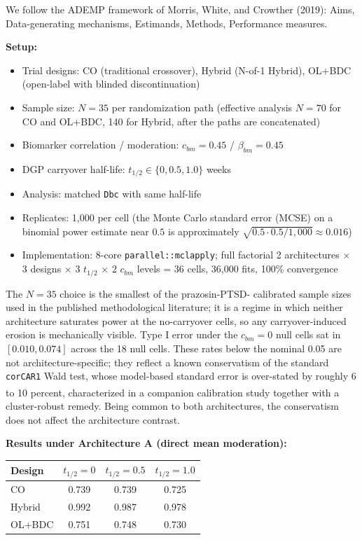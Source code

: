 \documentclass[
  11pt,
]{article}
\begin{document}
We follow the ADEMP framework of Morris, White, and Crowther (2019):
Aims, Data-generating mechanisms, Estimands, Methods, Performance
measures.

\textbf{Setup:}

\begin{itemize}
\item Trial designs: CO (traditional crossover), Hybrid (N-of-1
  Hybrid), OL+BDC (open-label with blinded discontinuation)
\item Sample size: $N = 35$ per randomization path (effective
  analysis $N = 70$ for CO and OL+BDC, 140 for Hybrid, after the
  paths are concatenated)
\item Biomarker correlation / moderation: $c_{bm} = 0.45$ /
  $\beta_{bm} = 0.45$
\item DGP carryover half-life: $t_{1/2} \in \{0, 0.5, 1.0\}$ weeks
\item Analysis: matched \texttt{Dbc} with same half-life
\item Replicates: 1{,}000 per cell (the Monte Carlo standard
  error (MCSE)
  on a binomial power estimate near $0.5$ is approximately
  $\sqrt{0.5 \cdot 0.5 / 1{,}000} \approx 0.016$)
\item Implementation: 8-core \texttt{parallel::mclapply}; full
  factorial 2 architectures $\times$ 3 designs $\times$ 3
  $t_{1/2}$ $\times$ 2 $c_{bm}$ levels = 36 cells, 36{,}000
  fits, 100\% convergence
\end{itemize}

The \(N = 35\) choice is the smallest of the prazosin-PTSD- calibrated
sample sizes used in the published methodological literature; it is a
regime in which neither architecture saturates power at the no-carryover
cells, so any carryover-induced erosion is mechanically visible. Type I
error under the \(c_{bm} = 0\) null cells sat in \([0.010, 0.074]\)
across the 18 null cells. These rates below the nominal 0.05 are not
architecture-specific; they reflect a known conservatism of the standard
\texttt{corCAR1} Wald test, whose model-based standard error is
over-stated by roughly 6 to 10 percent, characterized in a companion
calibration study\textsuperscript{}
together with a cluster-robust remedy. Being common to both
architectures, the conservatism does not affect the architecture
contrast.

\textbf{Results under Architecture A (direct mean moderation):}

\begin{table}[htbp]
\centering
\begin{tabular}{lccc}
\toprule
Design & $t_{1/2} = 0$ & $t_{1/2} = 0.5$ & $t_{1/2} = 1.0$ \\
\midrule
CO & 0.739 & 0.739 & 0.725 \\
Hybrid & 0.992 & 0.987 & 0.978 \\
OL+BDC & 0.751 & 0.748 & 0.730 \\
\bottomrule
\end{tabular}
\end{table}
\end{document}
